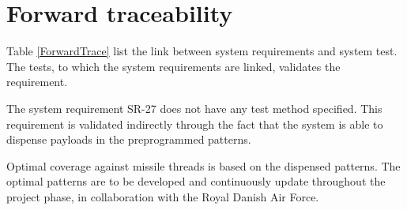 \documentclass[Main]{subfiles}
\begin{document}
\chapter{Forward traceability}
Table \ref{ForwardTrace} list the link between system requirements and system test. The tests, to which the system requirements are linked, validates the requirement. 

The system requirement SR-27 does not have any test method specified. 
This requirement is validated indirectly through the fact that the system is able to dispense payloads in the preprogrammed patterns.

Optimal coverage against missile threads is based on the dispensed patterns. 
The optimal patterns are to be developed and continuously update throughout the project phase, in collaboration with the Royal Danish Air Force.\\
\end{document}

